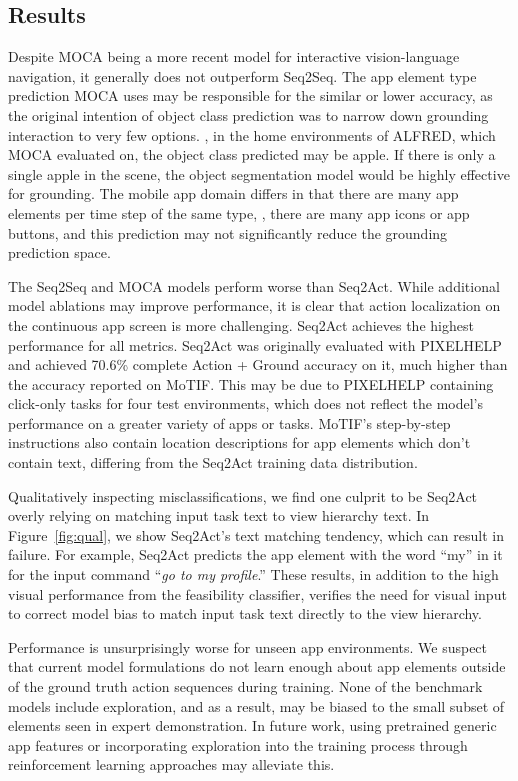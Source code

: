 \subsection{Results}
Despite MOCA being a more recent model for interactive vision-language navigation, it generally does not outperform Seq2Seq.
The app element type prediction MOCA uses may be responsible for the similar or lower accuracy, as the original intention of object class prediction was to narrow down grounding interaction to very few options. \Eg, in the home environments of ALFRED, which MOCA evaluated on, the object class predicted may be apple. If there is only a single apple in the scene, the object segmentation model would be highly effective for grounding. The mobile app domain differs in that there are many app elements per time step of the same type, \eg, there are many app icons or app buttons, and this prediction may not significantly reduce the grounding prediction space.

The Seq2Seq and MOCA models perform worse than Seq2Act. While additional model ablations may improve performance, it is clear that action localization on the continuous app screen is more challenging.
Seq2Act achieves the highest performance for all metrics. Seq2Act was originally evaluated with PIXELHELP~\cite{li-etal-2020-mapping} and achieved 70.6\% complete Action + Ground accuracy on it, much higher than the accuracy reported on MoTIF. This may be due to PIXELHELP containing click-only tasks for four test environments, which does not reflect the model's performance on a greater variety of apps or tasks. MoTIF's step-by-step instructions also contain location descriptions for app elements which don't contain text, differing from the Seq2Act training data distribution.

Qualitatively inspecting misclassifications, we find one culprit to be Seq2Act overly relying on matching input task text to view hierarchy text. In Figure~\ref{fig:qual}, we show Seq2Act's text matching tendency, which can result in failure. For example, Seq2Act predicts the app element with the word ``my'' in it for the input command ``\textit{go to my profile}.'' These results, in addition to the high visual performance from the feasibility classifier, verifies the need for visual input to correct model bias to match input task text directly to the view hierarchy.  

Performance is unsurprisingly worse for unseen app environments. 
We suspect that current model formulations do not learn enough about app elements outside of the ground truth action sequences during training. None of the benchmark models include exploration, and as a result, may be biased to the small subset of elements seen in expert demonstration. In future work, using pretrained generic app features or incorporating exploration into the training process through reinforcement learning approaches may alleviate this.

